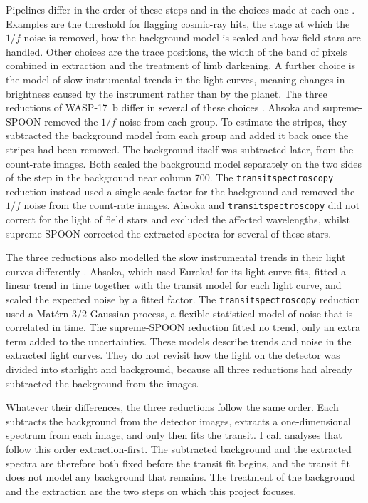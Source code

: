 Pipelines differ in the order of these steps and in the choices made at each
one \citep{RadicaEtAl2023,HolmbergMadhusudhan2023,LouieEtAl2025}. Examples are
the threshold for flagging cosmic-ray hits, the stage at which the $1/f$ noise
is removed, how the background model is scaled and how field stars are
handled. Other choices are the trace positions, the width of the band of
pixels combined in extraction and the treatment of limb darkening. A further
choice is the model of slow instrumental trends in the light curves, meaning
changes in brightness caused by the instrument rather than by the planet. The
three reductions of WASP-17~b differ in several of these choices
\citep{LouieEtAl2025}. Ahsoka and supreme-SPOON removed the $1/f$ noise from
each group. To estimate the stripes, they subtracted the background model from each group and added it back once the stripes had been removed. The background itself was subtracted later, from the count-rate images. Both scaled the background model separately on the two sides of the
step in the background near column 700. The \texttt{transitspectroscopy}
reduction instead used a single scale factor for the background and removed
the $1/f$ noise from the count-rate images. Ahsoka and
\texttt{transitspectroscopy} did not correct for the light of field stars and
excluded the affected wavelengths, whilst supreme-SPOON corrected the
extracted spectra for several of these stars.

The three reductions also modelled the slow instrumental trends in their light
curves differently \citep{LouieEtAl2025}. Ahsoka, which used Eureka! \citep{BellEtAl2022} for its light-curve fits, fitted a linear trend in time together with
the transit model for each light curve, and scaled the expected noise by a
fitted factor. The \texttt{transitspectroscopy} reduction used a
Mat\'ern-$3/2$ Gaussian process, a flexible statistical model of noise that is
correlated in time. The supreme-SPOON reduction fitted no trend, only an extra
term added to the uncertainties. These models describe trends and noise in
the extracted light curves. They do not revisit how the light on the detector
was divided into starlight and background, because all three reductions had
already subtracted the background from the images.

Whatever their differences, the three reductions follow the same order. Each
subtracts the background from the detector images, extracts a one-dimensional
spectrum from each image, and only then fits the transit. I call analyses that
follow this order extraction-first. The subtracted background and the extracted spectra are therefore both fixed before the transit fit begins, and the transit fit does not model any background that remains. The treatment of the background and the extraction are the two steps on which this project focuses.

